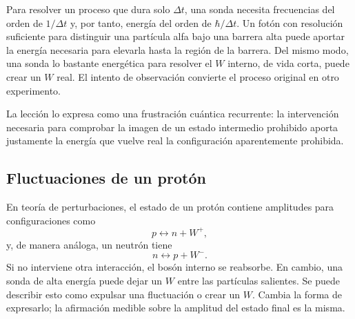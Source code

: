 Para resolver un proceso que dura solo \(\Delta t\), una sonda necesita frecuencias del orden de \(1/\Delta t\) y, por tanto, energía del orden de \(\hbar/\Delta t\). Un fotón con resolución suficiente para distinguir una partícula alfa bajo una barrera alta puede aportar la energía necesaria para elevarla hasta la región de la barrera. Del mismo modo, una sonda lo bastante energética para resolver el \(W\) interno, de vida corta, puede crear un \(W\) real. El intento de observación convierte el proceso original en otro experimento.

La lección lo expresa como una frustración cuántica recurrente: la intervención necesaria para comprobar la imagen de un estado intermedio prohibido aporta justamente la energía que vuelve real la configuración aparentemente prohibida.

\subsection{Fluctuaciones de un protón}

En teoría de perturbaciones, el estado de un protón contiene amplitudes para configuraciones como
\begin{equation}
  p\longleftrightarrow n+W^+,
\end{equation}
y, de manera análoga, un neutrón tiene
\begin{equation}
  n\longleftrightarrow p+W^-.
\end{equation}
Si no interviene otra interacción, el bosón interno se reabsorbe. En cambio, una sonda de alta energía puede dejar un \(W\) entre las partículas salientes. Se puede describir esto como expulsar una fluctuación o crear un \(W\). Cambia la forma de expresarlo; la afirmación medible sobre la amplitud del estado final es la misma.

\begin{classroomqa}
\end{classroomqa}

